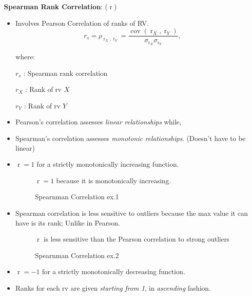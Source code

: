 \documentclass[	DIV=calc,%
paper=a4,%
fontsize=11pt,%
twocolumn]{scrartcl} %
\newcommand{\formdesc}[1]{\noindent\textbf{#1}}
\begin{document}
\formdesc{Spearman Rank Correlation}: ($\operatorname{r}$)
\begin{itemize}
	\item Involves Pearson Correlation of ranks of RV.
	\begin{equation}
		{\displaystyle r_{s}=\rho _{\operatorname {r} _{X},\operatorname {r} _{Y}}={\frac {\operatorname {cov} (\operatorname {r} _{X},\operatorname {r} _{Y})}{\sigma _{\operatorname {r} _{X}}\sigma _{\operatorname {r} _{Y}}}},}
	\end{equation}

where:

$r_{s}$ : Spearman rank correlation

${r} _{X}$ : Rank of rv $X$

${r} _{Y}$ :  Rank of rv $Y$

\item Pearson's correlation assesses \emph{linear relationships} while,
\item Spearman's correlation assesses \emph{monotonic relationships}. (Doesn't have to be linear)
\item $\operatorname{r}=1$ for a strictly monotonically increasing function.

\begin{figure}[ht!]
	\centering
	\graphicspath{ {images/math/} }
	\caption{Spearnman Correlation ex.1}
	{\vspace{10px} \small{$\operatorname{r}=1$ because it is monotonically increasing.}}
	
\end{figure}

\break

\item Spearman correlation is less sensitive to outliers because the max value it can have is its rank; Unlike in Pearson.

\begin{figure}[ht!]
	\centering
	\graphicspath{ {images/math/} }
	\caption{Spearnman Correlation ex.2}
	{\vspace{10px}\small{$\operatorname{r}$ is less sensitive than the Pearson correlation to strong outliers}}
	
\end{figure}

\item $\operatorname{r}=-1$ for a strictly monotonically decreasing function.
\item Ranks for each rv are given \emph{starting from 1}, in \emph{ascending} fashion.


\end{itemize}
\end{document}
